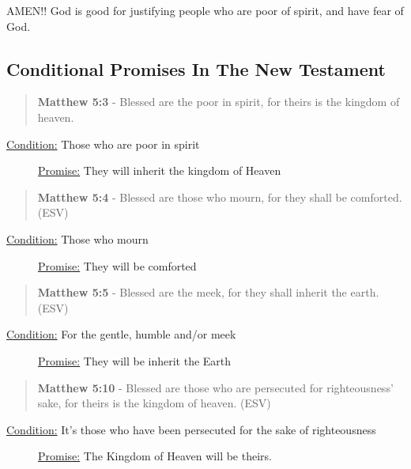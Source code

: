 \documentclass[11pt]{article}
\begin{document}
AMEN!! God is good for justifying people who are poor of spirit, and have fear of God.

\subsection{Conditional Promises In The New Testament}
\label{sec:org40a92fe}
\begin{quote}
\textbf{Matthew 5:3} - Blessed are the poor in spirit, for theirs is the kingdom of heaven.
\end{quote}

\begin{description}
\item[{\uline{Condition:} Those who are poor in spirit}] \uline{Promise:} They will inherit the kingdom of Heaven
\end{description}

\begin{quote}
\textbf{Matthew 5:4} - Blessed are those who mourn, for they shall be comforted. (ESV)
\end{quote}

\begin{description}
\item[{\uline{Condition:} Those who mourn}] \uline{Promise:} They will be comforted
\end{description}

\begin{quote}
\textbf{Matthew 5:5} - Blessed are the meek, for they shall inherit the earth. (ESV)
\end{quote}

\begin{description}
\item[{\uline{Condition:} For the gentle, humble and/or meek}] \uline{Promise:} They will be inherit the Earth
\end{description}

\begin{quote}
\textbf{Matthew 5:10} - Blessed are those who are persecuted for righteousness' sake, for theirs is the kingdom of heaven. (ESV)
\end{quote}

\begin{description}
\item[{\uline{Condition:} It's those who have been persecuted for the sake of righteousness}] \uline{Promise:} The Kingdom of Heaven will be theirs.
\end{description}
\end{document}
